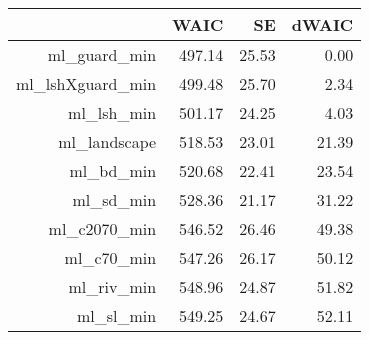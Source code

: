 \begin{table}[ht]
\centering
\begin{tabular}{rrrr}
  \hline
 & WAIC & SE & dWAIC \\ 
  \hline
ml\_guard\_min & 497.14 & 25.53 & 0.00 \\ 
  ml\_lshXguard\_min & 499.48 & 25.70 & 2.34 \\ 
  ml\_lsh\_min & 501.17 & 24.25 & 4.03 \\ 
  ml\_landscape & 518.53 & 23.01 & 21.39 \\ 
  ml\_bd\_min & 520.68 & 22.41 & 23.54 \\ 
  ml\_sd\_min & 528.36 & 21.17 & 31.22 \\ 
  ml\_c2070\_min & 546.52 & 26.46 & 49.38 \\ 
  ml\_c70\_min & 547.26 & 26.17 & 50.12 \\ 
  ml\_riv\_min & 548.96 & 24.87 & 51.82 \\ 
  ml\_sl\_min & 549.25 & 24.67 & 52.11 \\ 
   \hline
\end{tabular}
\end{table}

